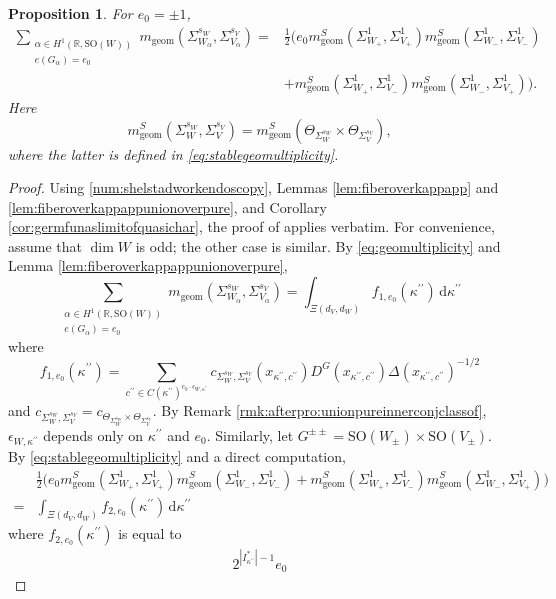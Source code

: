 \documentclass[12pt]{amsart}
\numberwithin{equation}{subsection}
\newcommand{\BR}{{\mathbb {R}}}
\newcommand{\SO}{{\mathrm{SO}}}
\newcommand{\ud}{\,\mathrm{d}}
\def\alp{{\alpha}}
\def\Del{{\Delta}}
\def\eps{{\epsilon}}
\def\Sig{{\Sigma}}
\def\p{\prime}
\def\geom{\mathrm{geom}}
\def\SO{\mathrm{SO}}
\newtheorem{pro}[thm]{Proposition}
\begin{document}
\begin{pro}\label{pro:analoguewaldspurger3.3}
For $e_0 = \pm 1$,
\begin{align*}
\sum_{
\substack{
\alp\in H^1(\BR,\SO(W))
\\
e(G_\alp) = e_0
}
}
m_\geom(\Sig^{s_W}_{W_\alp},
\Sig^{s_V}_{V_\alp}
) = &
\frac{1}{2}
\big(
e_0 m^S_\geom(\Sig^1_{W_+},\Sig^1_{V_+}) m^S_\geom(\Sig^1_{W_-},\Sig^1_{V_-})
\\
&+
m^S_\geom(\Sig^1_{W_+},\Sig^1_{V_-})
m^S_\geom(\Sig^1_{W_-},\Sig^1_{V_+})
\big).
\end{align*}
Here
\[
m^S_\geom(\Sig^{s_W}_W,\Sig^{s_V}_V) =
m^S_\geom(\Theta_{\Sig^{s_W}_W}\times \Theta_{\Sig^{s_V}_V}),
\]
where the latter is defined in \eqref{eq:stablegeomultiplicity}.
\end{pro}
\begin{proof}
Using \eqref{num:shelstadworkendoscopy}, Lemmas \ref{lem:fiberoverkappapp}
and \ref{lem:fiberoverkappappunionoverpure}, and Corollary
\ref{cor:germfunaslimitofquasichar}, the proof of
\cite[Prop.~3.3]{MR3155345} applies verbatim. For convenience, assume that
$\dim W$ is odd; the other case is similar. By \eqref{eq:geomultiplicity} and
Lemma \ref{lem:fiberoverkappappunionoverpure},
\[
\sum_{
\substack{
\alp\in H^1(\BR,\SO(W))
\\
e(G_\alp) = e_0
}
}
m_\geom(\Sig^{s_W}_{W_\alp},
\Sig^{s_V}_{V_\alp}
)
=
\int_{\Xi(d_V,d_W)}
f_{1,e_0}(\kappa^{\p\p})\ud \kappa^{\p\p}
\]
where
\[
f_{1,e_0}(\kappa^{\p\p}) =
\sum_{
    c^{\p\p}\in C(\kappa^{\p\p})^{e_0\cdot
    \eps_{W,\kappa^{\p\p}}}
}
c_{\Sig^{s_W}_W,\Sig^{s_V}_V}(x_{\kappa^{\p\p},c^{\p\p}})
D^G(x_{\kappa^{\p\p},c^{\p\p}})\Del(x_{\kappa^{\p\p},c^{\p\p}})^{-1/2}
\]
and
$
c_{\Sig^{s_W}_W,\Sig^{s_V}_V}=
c_{\Theta_{\Sig^{s_W}_W}\times\Theta_{\Sig^{s_V}_V}}.
$
By Remark \ref{rmk:afterpro:unionpureinnerconjclassof},
$\eps_{W,\kappa^{\p\p}}$ depends only on $\kappa^{\p\p}$ and $e_0$. Similarly,
let $G^{\pm\pm} = \SO(W_{\pm})\times \SO(V_\pm)$. By
\eqref{eq:stablegeomultiplicity} and a direct computation,
\begin{align*}
&\frac{1}{2}
\big(
e_0 m^S_\geom(\Sig^1_{W_+},\Sig^1_{V_+})
m^S_\geom(\Sig^1_{W_-},\Sig^1_{V_-})
+
m^S_\geom(\Sig^1_{W_+},\Sig^1_{V_-})
m^S_\geom(\Sig^1_{W_-},\Sig^1_{V_+})
\big)
\\
=&
\int_{\Xi(d_V,d_W)}
f_{2,e_0}(\kappa^{\p\p})\ud \kappa^{\p\p}
\end{align*}
where $f_{2,e_0}(\kappa^{\p\p})$ is equal to
\begin{align*}
2^{|I^*_{\kappa^{\p\p}}|-1}
e_0

\end{align*}
\end{proof}
\end{document}
